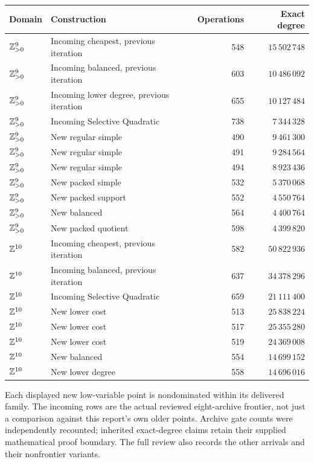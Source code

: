 \begin{center}\small
\begin{tabular}{llrr}
\toprule
Domain & Construction & Operations & Exact degree\\\midrule
$\mathbb Z_{>0}^9$ & Incoming cheapest, previous iteration &548&$15\,502\,748$\\
$\mathbb Z_{>0}^9$ & Incoming balanced, previous iteration &603&$10\,486\,092$\\
$\mathbb Z_{>0}^9$ & Incoming lower degree, previous iteration &655&$10\,127\,484$\\
$\mathbb Z_{>0}^9$ & Incoming Selective Quadratic &738&$7\,344\,328$\\\midrule
$\mathbb Z_{>0}^9$ & New regular simple & 490&$9\,461\,300$\\
$\mathbb Z_{>0}^9$ & New regular simple & 491&$9\,284\,564$\\
$\mathbb Z_{>0}^9$ & New regular simple & 494&$8\,923\,436$\\
$\mathbb Z_{>0}^9$ & New packed simple & 532&$5\,370\,068$\\
$\mathbb Z_{>0}^9$ & New packed support & 552&$4\,550\,764$\\
$\mathbb Z_{>0}^9$ & New balanced & 564&$4\,400\,764$\\
$\mathbb Z_{>0}^9$ & New packed quotient & 598&$4\,399\,820$\\
\midrule
$\mathbb Z^{10}$ & Incoming cheapest, previous iteration &582&$50\,822\,936$\\
$\mathbb Z^{10}$ & Incoming balanced, previous iteration &637&$34\,378\,296$\\
$\mathbb Z^{10}$ & Incoming Selective Quadratic &659&$21\,111\,400$\\\midrule
$\mathbb Z^{10}$ & New lower cost&513&$25\,838\,224$\\
$\mathbb Z^{10}$ & New lower cost&517&$25\,355\,280$\\
$\mathbb Z^{10}$ & New lower cost&519&$24\,369\,008$\\
$\mathbb Z^{10}$ & New balanced&554&$14\,699\,152$\\
$\mathbb Z^{10}$ & New lower degree&558&$14\,696\,016$\\
\bottomrule
\end{tabular}
\end{center}
Each displayed new low-variable point is nondominated within its delivered
family. The incoming rows are the actual reviewed eight-archive frontier,
not just a comparison against this report's own older points.
Archive gate counts were independently recounted; inherited exact-degree
claims retain their supplied mathematical proof boundary. The full review
also records the other arrivals and their nonfrontier variants.


